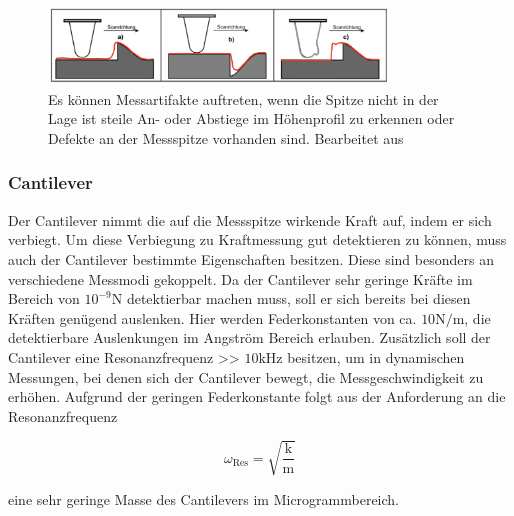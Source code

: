           \FloatBarrier

          \begin{figure}[h]
            \centering
            \includegraphics[width = 0.8\textwidth]{pictures/defekte.png}
            \caption{Es können Messartifakte auftreten, wenn die Spitze nicht in der Lage ist steile An- oder Abstiege im Höhenprofil zu erkennen oder Defekte an der Messspitze vorhanden sind. Bearbeitet aus \cite{tu_dortmund_versuchsanleitung_nodate}}
            \label{fig:defekte}
          \end{figure}
        
          \FloatBarrier

        
          \newpage
        \subsubsection*{Cantilever}
          Der Cantilever nimmt die auf die Messspitze wirkende Kraft auf, indem er sich verbiegt. Um diese Verbiegung zu Kraftmessung gut detektieren zu können, muss auch der Cantilever bestimmte Eigenschaften
          besitzen. Diese sind besonders an verschiedene Messmodi gekoppelt. Da der Cantilever sehr geringe Kräfte im Bereich von $10^{-9} \si{\newton}$ detektierbar machen muss, soll er sich bereits bei diesen
          Kräften genügend auslenken. Hier werden Federkonstanten von ca. $10 \si{\newton\per\metre}$, die detektierbare Auslenkungen im Angström Bereich erlauben. Zusätzlich soll der Cantilever eine  
          Resonanzfrequenz >> $10 \si{\kilo\hertz}$ besitzen, um in dynamischen Messungen, bei denen sich der Cantilever bewegt, die Messgeschwindigkeit zu erhöhen. Aufgrund der geringen Federkonstante folgt
          aus der Anforderung an die Resonanzfrequenz

          \begin{equation*}
            \omega_{\text{Res}} = \sqrt{\frac{\text{k}}{\text{m}}}
          \end{equation*}

          eine sehr geringe Masse des Cantilevers im Microgrammbereich.


